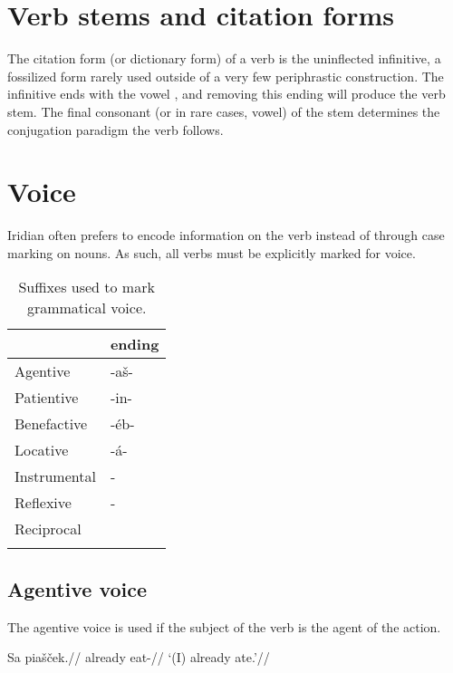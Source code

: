 \section{Verb stems and citation forms}

\par The citation form (or dictionary form) of a verb is the uninflected infinitive, a fossilized form rarely used outside of a very few periphrastic construction. The infinitive ends with the vowel , and removing this ending will produce the verb stem. The final consonant (or in rare cases, vowel) of the stem determines the conjugation paradigm the verb follows.

\section{Voice}

Iridian often prefers to encode information on the verb instead of through case marking on nouns. As such, all verbs must be explicitly marked for voice.
\begin{table}[h!]
	\small \centering
	\caption{Suffixes used to mark grammatical voice.}
	\begin{tabu} to 0.8\textwidth{YM}
		\toprule
		&{\sc ending}\\
		\midrule
		Agentive	& -a\v{s}-\\ \addlinespace
		Patientive	& -in-\\ \addlinespace
		Benefactive	& -\'eb-\\ \addlinespace
		Locative	& -á-\\ \addlinespace
		Instrumental& -\\ \addlinespace
		Reflexive	& -\\ \addlinespace
		Reciprocal	& \\ \addlinespace
		\bottomrule
	\end{tabu}
\end{table}


\subsection{Agentive voice}
\par The agentive voice is used if the subject of the verb is the agent of the action.

\pex 
\begingl
\gla Sa pia\v{s}\v{c}ek.//
\glb already eat-//
\glft `(I) already ate.'//
\endgl
\xe

